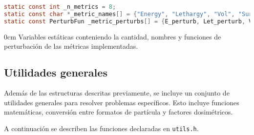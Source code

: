 \begin{footnotesize}
\begin{lstlisting}[language=C]
static const int _n_metrics = 8;
static const char *_metric_names[] = {"Energy", "Lethargy", "Vol", "SurfXY", "Guide", "Isotrop", "Polar", "PolarMu"};
static const PerturbFun _metric_perturbs[] = {E_perturb, Let_perturb, Vol_perturb, SurfXY_perturb, Guide_perturb, Isotrop_perturb, Polar_perturb, PolarMu_perturb};
\end{lstlisting}
\begin{addmargin}[0.5cm]{0cm}
Variables estáticas conteniendo la cantidad, nombres y funciones de perturbación de las métricas implementadas.
\end{addmargin}

\end{footnotesize}


\subsection{Utilidades generales}

Además de las estructuras descritas previamente, se incluye un conjunto de utilidades generales para resolver problemas específicos. Esto incluye funciones matemáticas, conversión entre formatos de partícula y factores dosimétricos.

A continuación se describen las funciones declaradas en \verb|utils.h|.

